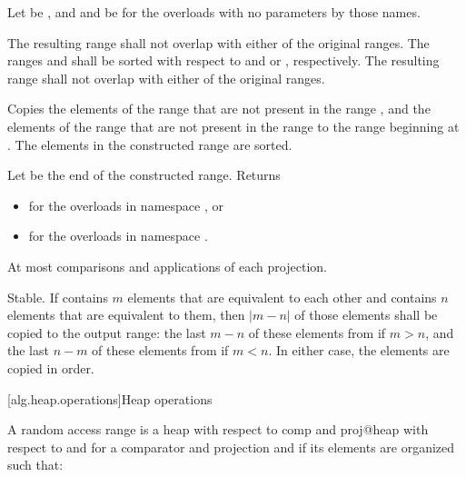 \begin{itemdescr}
\pnum
Let  be ,
and  and  be 
for the overloads with no parameters by those names.

\pnum
\requires
The resulting range shall not overlap with either of the original ranges.
The ranges  and  shall be sorted
with respect to  and  or , respectively.
The resulting range shall not overlap with either of the original ranges.

\pnum
\effects
Copies the elements of the range 
that are not present in the range ,
and the elements of the range 
that are not present in the range 
to the range beginning at .
The elements in the constructed range are sorted.

\pnum
\returns
Let  be the end of the constructed range.
Returns
\begin{itemize}
\item
  for the overloads in namespace , or
\item
  for the overloads in namespace .
\end{itemize}

\pnum
\complexity
At most 
comparisons and applications of each projection.

\pnum
\remarks
Stable.
If  contains $m$ elements
that are equivalent to each other and
 contains $n$ elements
that are equivalent to them,
then $|m - n|$ of those elements shall be copied to the output range:
the last $m - n$ of these elements from  if $m > n$, and
the last $n - m$ of these elements from  if $m < n$.
In either case, the elements are copied in order.
\end{itemdescr}

[alg.heap.operations]{Heap operations}

\pnum
A random access range  is a
{heap with respect to comp and proj@heap with respect to  and }
for a comparator and projection  and 
if its elements are organized such that:

